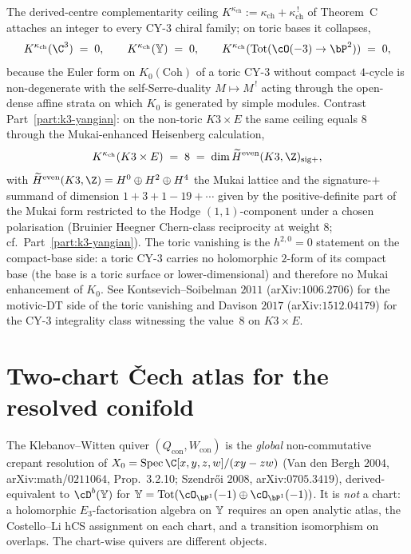 \begin{remark}
\label{rem:tcy3-coha-c3}
The derived-centre complementarity ceiling $K^{\kappa_{\mathrm{ch}}} := \kappa_{\mathrm{ch}} + \kappa_{\mathrm{ch}}^{\,!}$ of Theorem~C attaches an integer to every CY-$3$ chiral family; on toric bases it collapses,
\[
 K^{\kappa_{\mathrm{ch}}}(\C^3) \;=\; 0, \qquad
 K^{\kappa_{\mathrm{ch}}}(\bY) \;=\; 0, \qquad
 K^{\kappa_{\mathrm{ch}}}(\mathrm{Tot}(\cO(-3) \to \bP^2)) \;=\; 0,
\]
because the Euler form on $K_0(\mathrm{Coh})$ of a toric CY-$3$ without compact $4$-cycle is non-degenerate with the self-Serre-duality $M \mapsto M^{\,!}$ acting through the open-dense affine strata on which $K_0$ is generated by simple modules. Contrast Part~\ref{part:k3-yangian}: on the non-toric $K3 \times E$ the same ceiling equals $8$ through the Mukai-enhanced Heisenberg calculation,
\[
 K^{\kappa_{\mathrm{ch}}}(K3 \times E) \;=\; 8
 \;=\; \dim \widetilde H^{\mathrm{even}}(K3, \Z)_{\mathrm{sig}+},
\]
with $\widetilde H^{\mathrm{even}}(K3, \Z) = H^0 \oplus H^2 \oplus H^4$ the Mukai lattice and the signature-$+$ summand of dimension $1 + 3 + 1 - 19 + \cdots$ given by the positive-definite part of the Mukai form restricted to the Hodge $(1,1)$-component under a chosen polarisation (Bruinier Heegner Chern-class reciprocity at weight $8$; cf.\ Part~\ref{part:k3-yangian}). The toric vanishing is the $h^{2,0} = 0$ statement on the compact-base side: a toric CY-$3$ carries no holomorphic $2$-form of its compact base (the base is a toric surface or lower-dimensional) and therefore no Mukai enhancement of $K_0$. See Kontsevich--Soibelman $2011$ (arXiv:$1006.2706$) for the motivic-DT side of the toric vanishing and Davison $2017$ (arXiv:$1512.04179$) for the CY-$3$ integrality class witnessing the value~$8$ on $K3 \times E$.
\end{remark}



\section{Two-chart \v{C}ech atlas for the resolved conifold}
\label{sec:conifold-two-chart-cech}

The Klebanov--Witten quiver $(Q_{\mathrm{con}}, W_{\mathrm{con}})$ is the \emph{global} non-commutative crepant resolution of $X_0 = \mathrm{Spec}\,\C[x,y,z,w]/(xy-zw)$ (Van den Bergh $2004$, arXiv:math/$0211064$, Prop.~3.2.10; Szendr\H{o}i $2008$, arXiv:$0705.3419$), derived-equivalent to $\cD^b(\bY)$ for $\bY = \mathrm{Tot}(\cO_{\bP^1}(-1) \oplus \cO_{\bP^1}(-1))$. It is \emph{not} a chart: a holomorphic $E_3$-factorisation algebra on $\mathbb{Y}$ requires an open analytic atlas, the Costello--Li hCS assignment on each chart, and a transition isomorphism on overlaps. The chart-wise quivers are different objects.

